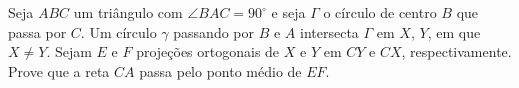 Seja $ABC$ um triângulo com $\angle BAC = 90^\circ$ e seja $\Gamma$ o círculo de centro $B$ que passa por $C$. Um círculo $\gamma$ passando por $B$ e $A$ intersecta $\Gamma$ em $X$, $Y$, em que $X \neq Y$.
Sejam $E$ e $F$ projeções ortogonais de $X$ e $Y$ em $CY$ e $CX$, respectivamente.
Prove que a reta $CA$ passa pelo ponto médio de $EF$.
